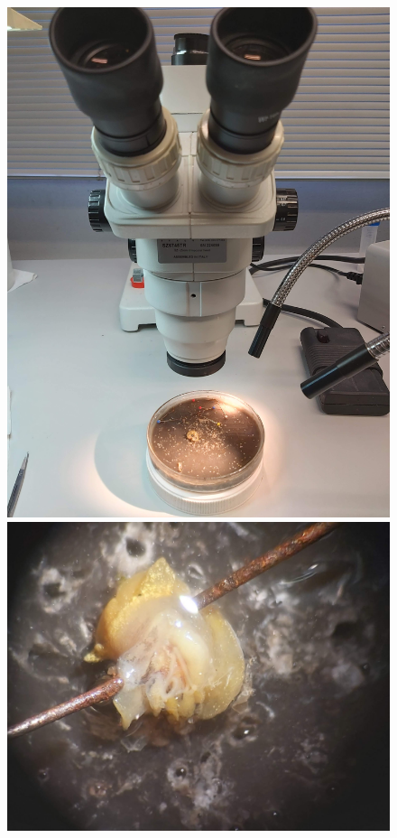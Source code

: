 \begin{figure}[htb!]
	\centering
	\includegraphics[width=0.8\linewidth]{img/methods/preparation/microscope}
	\endminipage\qquad
	\centering
	\includegraphics[width=0.8\linewidth]{img/methods/preparation/rem_shell.jpg}
	\endminipage\qquad 
	\centering

\end{figure}
